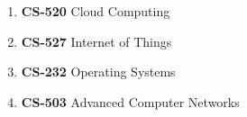 \begin{enumerate}

\item
\textbf{CS-520} Cloud Computing

\item
\textbf{CS-527} Internet of Things

\item
\textbf{CS-232} Operating Systems

\item
\textbf{CS-503} Advanced Computer Networks

\end{enumerate}